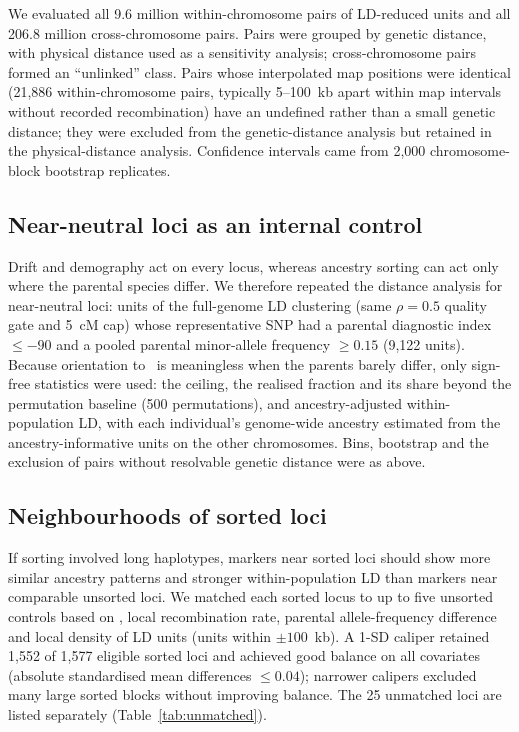 We evaluated all 9.6 million within-chromosome pairs of LD-reduced units and all 206.8 million cross-chromosome pairs. Pairs were grouped by genetic distance, with physical distance used as a sensitivity analysis; cross-chromosome pairs formed an ``unlinked'' class. Pairs whose interpolated map positions were identical (21,886 within-chromosome pairs, typically 5--100~kb apart within map intervals without recorded recombination) have an undefined rather than a small genetic distance; they were excluded from the genetic-distance analysis but retained in the physical-distance analysis. Confidence intervals came from 2,000 chromosome-block bootstrap replicates.

\subsection{Near-neutral loci as an internal control}

Drift and demography act on every locus, whereas ancestry sorting can act only where the parental species differ. We therefore repeated the distance analysis for near-neutral loci: units of the full-genome LD clustering (same $\rho=0.5$ quality gate and 5~cM cap) whose representative SNP had a parental diagnostic index $\leq-90$ and a pooled parental minor-allele frequency $\geq0.15$ (9,122 units). Because orientation to \Fa\ is meaningless when the parents barely differ, only sign-free statistics were used: the ceiling, the realised fraction and its share beyond the permutation baseline (500 permutations), and ancestry-adjusted within-population LD, with each individual's genome-wide ancestry estimated from the ancestry-informative units on the other chromosomes. Bins, bootstrap and the exclusion of pairs without resolvable genetic distance were as above.

\subsection{Neighbourhoods of sorted loci}

If sorting involved long haplotypes, markers near sorted loci should show more similar ancestry patterns and stronger within-population LD than markers near comparable unsorted loci. We matched each sorted locus to up to five unsorted controls based on \FST, local recombination rate, parental allele-frequency difference and local density of LD units (units within $\pm100$~kb). A 1-SD caliper retained 1,552 of 1,577 eligible sorted loci and achieved good balance on all covariates (absolute standardised mean differences $\leq0.04$); narrower calipers excluded many large sorted blocks without improving balance. The 25 unmatched loci are listed separately (Table~\ref{tab:unmatched}).

